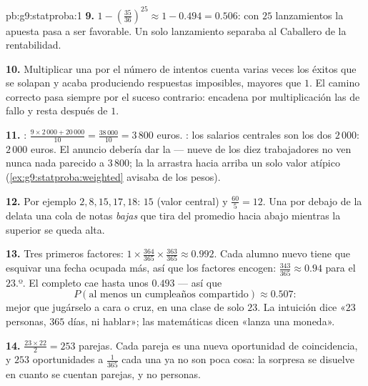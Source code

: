 \begin{solution}{pb:g9:statproba:1}
\textbf{9.} $1 - \left(\frac{35}{36}\right)^{25} \approx
1 - 0.494 = 0.506$: con $25$ lanzamientos la apuesta pasa a ser favorable.
Un solo lanzamiento separaba al Caballero de la rentabilidad.

\textbf{10.} Multiplicar una  por el número de intentos
cuenta varias veces los éxitos que se solapan y acaba
produciendo respuestas imposibles, mayores que $1$. El camino correcto pasa
siempre por el suceso contrario: encadena por multiplicación las  de fallo
y resta después de $1$.

\textbf{11.} : $\frac{9 \times 2\,000 + 20\,000}{10} =
\frac{38\,000}{10} = 3\,800$ euros. : los salarios centrales
son los dos $2\,000$:  $2\,000$ euros. El anuncio
debería dar la  --- nueve de los diez trabajadores no ven nunca
nada parecido a $3\,800$; la  la arrastra hacia arriba un solo
valor atípico (\cref{ex:g9:statproba:weighted} avisaba de los pesos).

\textbf{12.} Por ejemplo $2, 8, 15, 17, 18$:  $15$
(valor central) y  $\frac{60}{5} = 12$. Una  por debajo de la
 delata una cola de notas \emph{bajas} que tira del promedio
hacia abajo mientras la  superior se queda alta.

\textbf{13.} Tres primeros factores:
$1 \times \frac{364}{365} \times \frac{363}{365} \approx
0.992$. Cada alumno nuevo tiene que esquivar una fecha ocupada más, así que los
factores encogen: $\frac{343}{365} \approx 0.94$ para el
$23$.º. El  completo cae hasta unos $0.493$ --- así que
\[
P(\text{al menos un cumpleaños compartido}) \approx 0.507 :
\]
mejor que jugárselo a cara o cruz, en una clase de solo $23$. La intuición dice
«$23$ personas, $365$ días, ni hablar»; las matemáticas dicen
«lanza una moneda».

\textbf{14.} $\frac{23 \times 22}{2} = 253$ parejas. Cada pareja es
una nueva oportunidad de coincidencia, y $253$ oportunidades
a $\frac{1}{365}$ cada una ya no son poca cosa: la
sorpresa se disuelve en cuanto se cuentan parejas, y no personas.


\end{solution}
